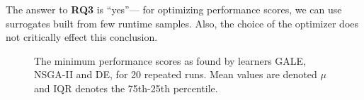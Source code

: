 \documentclass{sig-alternative}
\begin{document}
\begin{myshadowbox}
The answer to {\bf RQ3} is ``yes''--- for optimizing performance scores, we can use surrogates built from few runtime samples. Also, the choice of the optimizer does not critically effect this conclusion.
\end{myshadowbox}


\begin{figure}
\caption{The minimum performance scores as found by learners GALE, NSGA-II and DE, for  20 repeated
runs. Mean values are denoted $\mu$ and IQR denotes the 75th-25th percentile.}
\label{fig:external_validity}
\end{figure}
\end{document}
